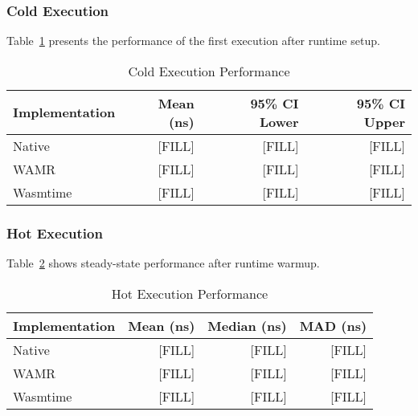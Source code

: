 \subsubsection{Cold Execution}

Table~\ref{tab:cold-performance} presents the performance of the first execution after runtime setup.

\begin{table}[htbp]
\centering
\caption{Cold Execution Performance}
\label{tab:cold-performance}
\begin{tabular}{lrrr}
\toprule
\textbf{Implementation} & \textbf{Mean (ns)} & \textbf{95\% CI Lower} & \textbf{95\% CI Upper} \\
\midrule
Native        & [FILL]    & [FILL]  & [FILL] \\
WAMR          & [FILL]    & [FILL]  & [FILL] \\
Wasmtime      & [FILL]    & [FILL]  & [FILL] \\
\bottomrule
\end{tabular}
\end{table}

\subsubsection{Hot Execution}

Table~\ref{tab:hot-performance} shows steady-state performance after runtime warmup.

\begin{table}[htbp]
\centering
\caption{Hot Execution Performance}
\label{tab:hot-performance}
\begin{tabular}{lrrr}
\toprule
\textbf{Implementation} & \textbf{Mean (ns)} & \textbf{Median (ns)} & \textbf{MAD (ns)} \\
\midrule
Native        & [FILL]    & [FILL]  & [FILL] \\
WAMR          & [FILL]    & [FILL]  & [FILL] \\
Wasmtime      & [FILL]    & [FILL]  & [FILL] \\
\bottomrule
\end{tabular}
\end{table}


